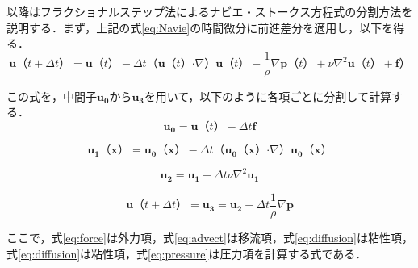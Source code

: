 \documentclass[a4j,12pt]{jreport}
\begin{document}
以降はフラクショナルステップ法によるナビエ・ストークス方程式の分割方法を説明する．まず，上記の式\ref{eq:Navie}の時間微分に前進差分を適用し，以下を得る．
\[
\bm{u} （t + \varDelta t） =   \bm{u} （t）-\varDelta t （\bm{u} （t）  \boldsymbol{\cdot}\nabla） \bm{u} （t）- \frac{1}{\rho}\nabla \bm{p}  （t）  + \nu\nabla^2\bm{u} （t）  + \bm{f}） 
\]

この式を，中間子$\bm{u_0}$から$\bm{u_3}$を用いて，以下のように各項ごとに分割して計算する．
\begin{equation}\label{eq:force}
	\bm{u_0} =  \bm{u} （t）  - \varDelta t \bm{f} 
\end{equation} 

\begin{equation}\label{eq:advect}
	\bm{u_1} （\bm{x}） = \bm{u_0} （\bm{x}） - \varDelta t （\bm{u_0}（\bm{x}）  \boldsymbol{\cdot}\nabla） \bm{u_0}（\bm{x}）
\end{equation}

\begin{equation}\label{eq:diffusion}
	\bm{u_2}   =  \bm{u_1} - \varDelta t \nu\nabla^2\bm{u_1}
\end{equation}

\begin{equation}\label{eq:pressure}
	\bm{u} （t + \varDelta t）= \bm{u_3}  =  \bm{u_2} - \varDelta t \frac{1}{\rho}\nabla \bm{p} 
\end{equation} 

ここで，式\ref{eq:force}は外力項，式\ref{eq:advect}は移流項，式\ref{eq:diffusion}は粘性項，式\ref{eq:diffusion}は粘性項，式\ref{eq:pressure}は圧力項を計算する式である．


\end{document}
